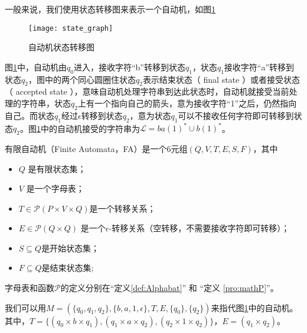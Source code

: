 \begin{remark}
    一般来说，我们使用状态转移图来表示一个自动机，如图\ref{fig:state_graph}
\end{remark}


\begin{figure}[!htbp]
    \centering
    \texttt{[image: state\_graph]}
    \caption{自动机状态转移图}
    \label{fig:state_graph}
\end{figure}

图\ref{fig:state_graph}中，自动机由$q_0$进入，接收字符“b”转移到状态$q_1$，状态$q_1$接收字符“a”转移到状态$q_2$，图中的两个同心圆圈住状态$q_2$表示结束状态（ final state ）或者接受状态（ accepted state ），意味自动机处理字符串到达此状态时，自动机就接受当前处理的字符串，状态$q_2$上有一个指向自己的箭头，意为接收字符“1”之后，仍然指向自己。而状态$q_1$经过$\epsilon$转移到状态$q_2$，意为状态$q_1$可以不接收任何字符即可转移到状态$q_2$。图\ref{fig:state_graph}中的自动机接受的字符串为$\mathcal{L}=ba(1)^*\cup b(1)^*$。

\begin{definition}
    有限自动机（Finite Automata，FA）是一个6元组$(Q,V,T,E,S,F)$，其中
    \begin{itemize}
        \item $Q$ 是有限状态集；
        \item $V$ 是一个字母表；
        \item $ T \in \mathcal{P}(P\times V \times Q) $是一个转移关系；
        \item $ E \in \mathcal{P}(Q\times Q)$ 是一个$\epsilon$-转移关系（空转移，不需要接收字符即可转移）；
        \item $ S \subseteq Q $是开始状态集；
        \item $ F \subseteq Q $是结束状态集;
    \end{itemize}
    字母表和函数$\mathcal{P}$的定义分别在“定义\ref{def:Alphabat}” 和 “定义 \ref{pro:mathP}”。
\end{definition}

\begin{example}
    我们可以用$M=(\{q_0,q_1,q_2\},\{b,a,1,\epsilon\},T,E,\{q_0\},\{q_2\})$来指代图\ref{fig:state_graph}中的自动机。其中，$T=\{(q_0 \times b \times q_1),(q_1\times a \times q_2),(q_2\times 1 \times q_2)\}$，$E=(q_1 \times q_2)$。
\end{example}

